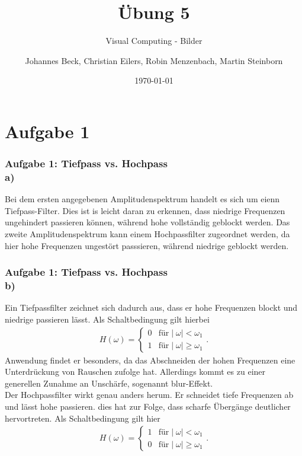 \documentclass[accentcolor=tud9c,colorbacktitle,inverttitle,landscape,german,presentation,t]{tudbeamer}
\begin{document}
\title{\"Ubung 5}
\subtitle{Visual Computing - Bilder}

\author[Johannes Beck, Christian Eilers, Robin Menzenbach, Martin Steinborn]{Johannes Beck, Christian Eilers, Robin Menzenbach, Martin Steinborn}



\date{\today}

\begin{titleframe}
\end{titleframe}

\section{Aufgabe 1}
	\begin{frame}
		\frametitle{Aufgabe 1: Tiefpass vs. Hochpass \\ a)}
		Bei dem ersten angegebenen Amplitudenspektrum handelt es sich um eienn Tiefpass-Filter. Dies ist is leicht daran zu erkennen, dass niedrige Frequenzen ungehindert passieren k\"onnen, w\"ahrend hohe vollst\"andig geblockt werden.
		Das zweite Amplitudenspektrum kann einem Hochpassfilter zugeordnet werden, da hier hohe Frequenzen ungest\"ort passsieren, w\"ahrend niedrige geblockt werden.
	\end{frame}
	
	\begin{frame}
	\frametitle{Aufgabe 1: Tiefpass vs. Hochpass \\ b)} %
	Ein Tiefpassfilter zeichnet sich dadurch aus, dass er hohe Frequenzen blockt und niedrige passieren l\"asst. Als Schaltbedingung gilt hierbei
	\begin{align*}
	H(\omega) = \left\{\begin{array}{rl}0 & \textrm{f\"ur} \mid\omega\mid < \omega_1 \\ 1 & \textrm{f\"ur} \mid\omega\mid \geq \omega_1	\end{array}\right. .
\end{align*}
	Anwendung findet er besonders, da das Abschneiden der hohen Frequenzen  eine Unterdr\"uckung von Rauschen zufolge hat. Allerdings kommt es zu einer generellen Zunahme an Unsch\"arfe, sogenannt blur-Effekt.	\\	
	
	Der Hochpassfilter wirkt genau anders herum. Er schneidet tiefe Frequenzen ab und l\"asst hohe passieren. dies hat zur Folge, dass scharfe \"Uberg\"ange deutlicher hervortreten. Als Schaltbedingung gilt hier
	\begin{align*}
	H(\omega) = \left\{\begin{array}{rl}1 & \textrm{f\"ur} \mid\omega\mid < \omega_1 \\ 0 & \textrm{f\"ur} \mid\omega\mid \geq \omega_1	\end{array}\right. .
\end{align*}	
	\end{frame}
\end{document}
